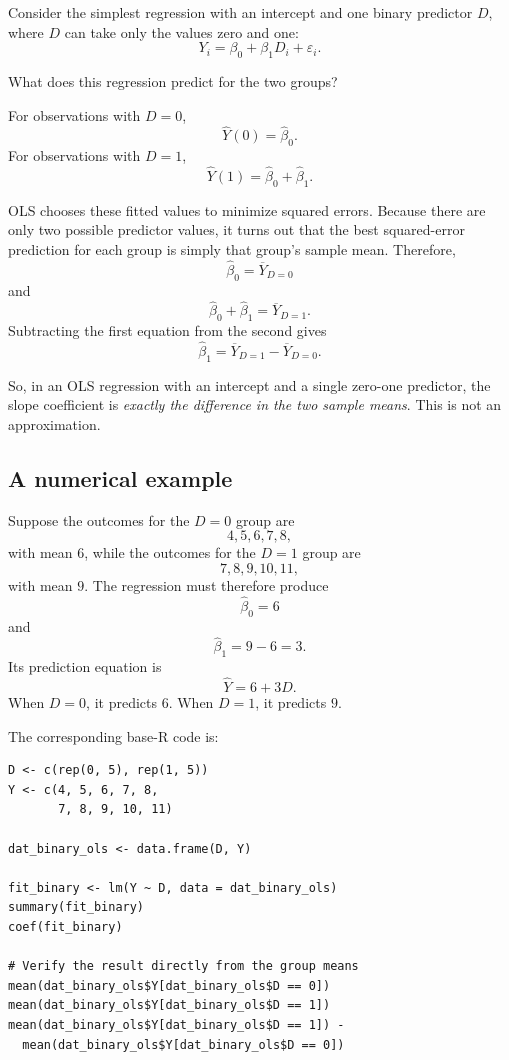 \documentclass[11pt]{report}
\begin{document}
Consider the simplest regression with an intercept and one binary predictor \(D\), where \(D\) can take only the values zero and one:
\[
Y_i = \beta_0 + \beta_1D_i + \varepsilon_i.
\]

What does this regression predict for the two groups?

For observations with \(D=0\),
\[
\widehat{Y}(0)=\widehat{\beta}_0.
\]
For observations with \(D=1\),
\[
\widehat{Y}(1)=\widehat{\beta}_0+\widehat{\beta}_1.
\]

OLS chooses these fitted values to minimize squared errors. Because there are only two possible predictor values, it turns out that the best squared-error prediction for each group is simply that group's sample mean. Therefore,
\[
\widehat{\beta}_0=\overline{Y}_{D=0}
\]
and
\[
\widehat{\beta}_0+\widehat{\beta}_1=\overline{Y}_{D=1}.
\]
Subtracting the first equation from the second gives
\[
\boxed{
\widehat{\beta}_1
=
\overline{Y}_{D=1}-\overline{Y}_{D=0}.
}
\]

So, in an OLS regression with an intercept and a single zero-one predictor, the slope coefficient is \emph{exactly the difference in the two sample means}. This is not an approximation.

\subsection{A numerical example}

Suppose the outcomes for the \(D=0\) group are
\[
4,5,6,7,8,
\]
with mean \(6\), while the outcomes for the \(D=1\) group are
\[
7,8,9,10,11,
\]
with mean \(9\). The regression must therefore produce
\[
\widehat{\beta}_0=6
\]
and
\[
\widehat{\beta}_1=9-6=3.
\]
Its prediction equation is
\[
\widehat{Y}=6+3D.
\]
When \(D=0\), it predicts \(6\). When \(D=1\), it predicts \(9\).

The corresponding base-R code is:

\begin{lstlisting}
D <- c(rep(0, 5), rep(1, 5))
Y <- c(4, 5, 6, 7, 8,
       7, 8, 9, 10, 11)

dat_binary_ols <- data.frame(D, Y)

fit_binary <- lm(Y ~ D, data = dat_binary_ols)
summary(fit_binary)
coef(fit_binary)

# Verify the result directly from the group means
mean(dat_binary_ols$Y[dat_binary_ols$D == 0])
mean(dat_binary_ols$Y[dat_binary_ols$D == 1])
mean(dat_binary_ols$Y[dat_binary_ols$D == 1]) -
  mean(dat_binary_ols$Y[dat_binary_ols$D == 0])
\end{lstlisting}
\end{document}
